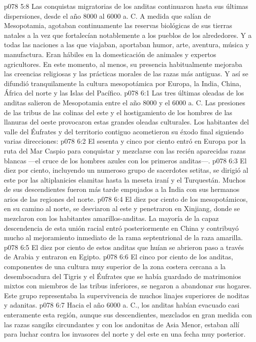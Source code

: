 \vs p078 5:8 \pc Las conquistas migratorias de los anditas continuaron hasta sus últimas dispersiones, desde el año 8000 al 6000 a. C. A medida que salían de Mesopotamia, agotaban continuamente las reservas biológicas de sus tierras natales a la vez que fortalecían notablemente a los pueblos de los alrededores. Y a todas las naciones a las que viajaban, aportaban humor, arte, aventura, música y manufactura. Eran hábiles en la domesticación de animales y expertos agricultores. En este momento, al menos, su presencia habitualmente mejoraba las creencias religiosas y las prácticas morales de las razas más antiguas. Y así se difundió tranquilamente la cultura mesopotámica por Europa, la India, China, África del norte y las Islas del Pacífico.
\vs p078 6:1 Las tres últimas oleadas de los anditas salieron de Mesopotamia entre el año 8000 y el 6000 a. C. Las presiones de las tribus de las colinas del este y el hostigamiento de los hombres de las llanuras del oeste provocaron estas grandes oleadas culturales. Los habitantes del valle del Éufrates y del territorio contiguo acometieron su éxodo final siguiendo varias direcciones:
\vs p078 6:2 El sesenta y cinco por ciento entró en Europa por la ruta del Mar Caspio para conquistar y mezclarse con las recién aparecidas razas blancas ---el cruce de los hombres azules con los primeros anditas---.
\vs p078 6:3 El diez por ciento, incluyendo un numeroso grupo de sacerdotes setitas, se dirigió al este por las altiplanicies elamitas hasta la meseta iraní y el Turquestán. Muchos de sus descendientes fueron más tarde empujados a la India con sus hermanos arios de las regiones del norte.
\vs p078 6:4 El diez por ciento de los mesopotámicos, en su camino al norte, se desviaron al este y penetraron en Xinjiang, donde se mezclaron con los habitantes amarillos\hyp{}anditas. La mayoría de la capaz descendencia de esta unión racial entró posteriormente en China y contribuyó mucho al mejoramiento inmediato de la rama septentrional de la raza amarilla.
\vs p078 6:5 El diez por ciento de estos anditas que huían se abrieron paso a través de Arabia y entraron en Egipto.
\vs p078 6:6 \pc El cinco por ciento de los anditas, componentes de una cultura muy superior de la zona costera cercana a la desembocadura del Tigris y el Éufrates que se había guardado de matrimonios mixtos con miembros de las tribus inferiores, se negaron a abandonar sus hogares. Este grupo representaba la supervivencia de muchos linajes superiores de noditas y adanitas.
\vs p078 6:7 \pc Hacia el año 6000 a. C., los anditas habían evacuado casi enteramente esta región, aunque sus descendientes, mezclados en gran medida con las razas sangiks circundantes y con los andonitas de Asia Menor, estaban allí para luchar contra los invasores del norte y del este en una fecha muy posterior.

